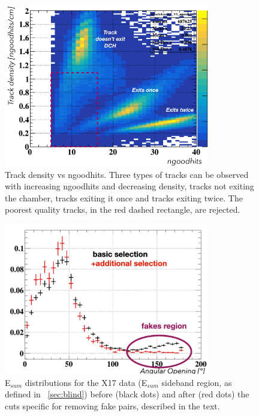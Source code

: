 \begin{refsection}
        \begin{figure}[]
            \centering
            \includegraphics[width=0.8\textwidth]{Figures/X17/Analysis/halfturn_cond.png}
            \caption{Track density vs ngoodhits. Three types of tracks can be observed with increasing ngoodhits and decreasing density, tracks not exiting the chamber, tracks exiting it once and tracks exiting twice. The poorest quality tracks, in the red dashed rectangle, are rejected.}
            \label{fig:X17:tracks}
        \end{figure}

        \begin{figure}[]
            \centering
            \includegraphics[width=0.8\textwidth]{Figures/X17/Analysis/Fake.pdf}
            \caption{E$_{sum}$ distributions for the X17 data (E$_{sum}$ sideband region, as defined in ~\ref{sec:blind}) before (black dots) and after (red dots) the cuts specific for removing fake pairs, described in the text.}
            \label{fig:X17:fakes}
        \end{figure}


\end{refsection}
